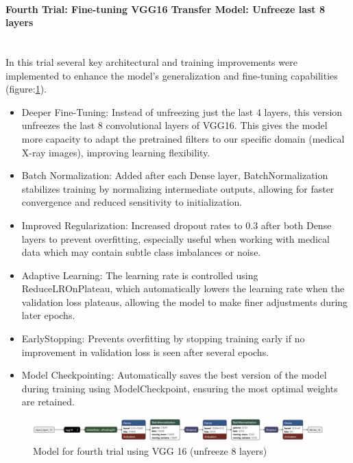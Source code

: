 \documentclass{article}
\begin{document}
\paragraph{Fourth Trial: Fine-tuning VGG16 Transfer Model: Unfreeze last 8 layers}\mbox{}\\
In this trial several key architectural and training improvements were implemented to enhance the model's generalization and fine-tuning capabilities (figure:\ref{fig:vgg16result3.png}).
\begin{itemize}
    \item Deeper Fine-Tuning: Instead of unfreezing just the last 4 layers, this version unfreezes the last 8 convolutional layers of VGG16. This gives the model more capacity to adapt the pretrained filters to our specific domain (medical X-ray images), improving learning flexibility.
    \item Batch Normalization: Added after each Dense layer, BatchNormalization stabilizes training by normalizing intermediate outputs, allowing for faster convergence and reduced sensitivity to initialization.
    \item Improved Regularization: Increased dropout rates to 0.3 after both Dense layers to prevent overfitting, especially useful when working with medical data which may contain subtle class imbalances or noise.
    \item Adaptive Learning: The learning rate is controlled using ReduceLROnPlateau, which automatically lowers the learning rate when the validation loss plateaus, allowing the model to make finer adjustments during later epochs.
    \item EarlyStopping: Prevents overfitting by stopping training early if no improvement in validation loss is seen after several epochs.
    \item Model Checkpointing: Automatically saves the best version of the model during training using ModelCheckpoint, ensuring the most optimal weights are retained.
\end{itemize}
\begin{figure}[h!] %
    \centering
    \includegraphics[width=1.0\linewidth]{model_vgg16_fullsize3.keras (1).png}
    \caption{Model for fourth trial using VGG 16 (unfreeze 8 layers)}
    \label{fig:vgg16result3.png}
\end{figure}
\end{document}
